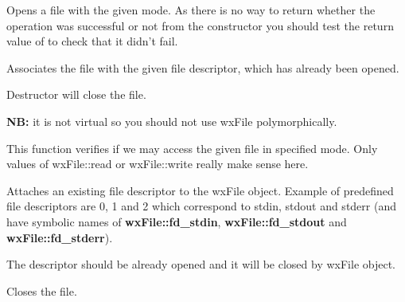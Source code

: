 Opens a file with the given mode. As there is no way to return whether the
operation was successful or not from the constructor you should test the
return value of  to check that it didn't
fail.


Associates the file with the given file descriptor, which has already been opened.





\label{wxfiledtor}


Destructor will close the file.

{\bf NB:} it is not virtual so you should not use wxFile polymorphically.

\label{wxfileaccess}


This function verifies if we may access the given file in specified mode. Only
values of wxFile::read or wxFile::write really make sense here.

\label{wxfileattach}


Attaches an existing file descriptor to the wxFile object. Example of predefined
file descriptors are 0, 1 and 2 which correspond to stdin, stdout and stderr (and
have symbolic names of {\bf wxFile::fd\_stdin}, {\bf wxFile::fd\_stdout} and {\bf wxFile::fd\_stderr}).

The descriptor should be already opened and it will be closed by wxFile
object.

\label{wxfileclose}


Closes the file.

\label{wxfilecreate}

